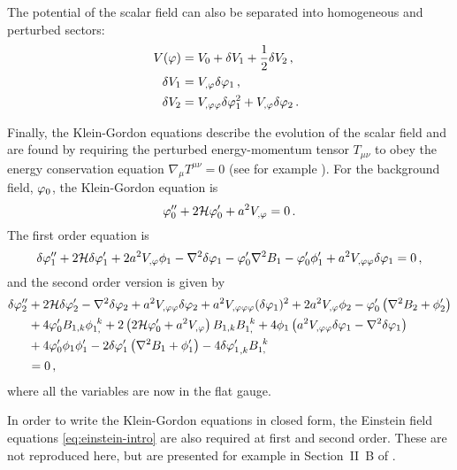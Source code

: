 The potential of the scalar field can also be separated into homogeneous and
perturbed sectors:
% 
\begin{align}
 V(\varphi) &= V_{0} + \delta V_{1} + \frac{1}{2}\delta V _{2}\,,\quad \\
 \delta V_{1} &= V_{,\varphi} \delta\varphi_{1} \,,\quad \\
 \delta V_{2} &= V_{,\varphi\varphi} \delta\varphi_{1}^2 + V_{,\varphi}\delta\varphi_{2} \,.
\end{align}
% 


Finally, the Klein-Gordon equations describe the evolution of the scalar field and
are
found by requiring the perturbed energy-momentum tensor $T_{\mu\nu}$ to obey the
energy conservation equation $\nabla_\mu T^{\mu\nu}=0$ (see for example
). For the
background field, $\varphi_0$, the Klein-Gordon equation is 
%
\begin{equation}
\label{eq:KGback-num}
\varphi_{0}''+2\mathcal{H}\varphi_{0}'+a^2 V_{,\varphi} = 0\,.   
\end{equation}
%
% 
% 
The first order equation is
%
\begin{equation}
\label{eq:KGflatsingle-num}
\delta\varphi_{1}''+2\mathcal{H}\delta\varphi_{1}'+2a^2 V_{,\varphi} \phi_1
-\nabla^2\delta\varphi_{1}-\varphi_{0}'\nabla^2 B_1
-\varphi_{0}'\phi'_1 + a^2 V_{,\varphi\varphi} \delta\varphi_{1}
=0\,,
\end{equation}
%
and the second order version is given by
%
\begin{align}
\label{eq:KG2flatsingle-num}
\dvp2'' &+ 2\H\dvp2'-\nabla^2\dvp2+a^2 \Upp \dvp2
+ a^2 \Uppp (\dvp1)^2 +2a^2 \Uphi \phi_2
-\vp_{0}'\left(\nabla^2 B_2+\phi_2'\right)\nonumber\\
%
&+ 4\vp_{0}' B_{1,k}\phi_{1,}^{~k}
+2\left(2\H\vp_{0}'+a^2 \Uphi\right) B_{1,k}B_{1,}^{~k}
+4\phi_1\left(a^2 \Upp \dvp1-\nabla^2\dvp1\right) \nonumber\\
&+ 4\vp_{0}'\phi_1\phi_1'
-2\dvp1'\left(\nabla^2 B_1+\phi_1'\right)-4{\dvp1'}_{,k}B_{1,}^{~k} \nonumber \\
&= 0\,,
\end{align}
% 
where all the variables are now in the flat gauge.


In order to write the Klein-Gordon equations in closed form, the Einstein field
equations \eqref{eq:einstein-intro} are also required at first and second order.
These are not reproduced here, but are presented for example in Section~II~B of
. 

